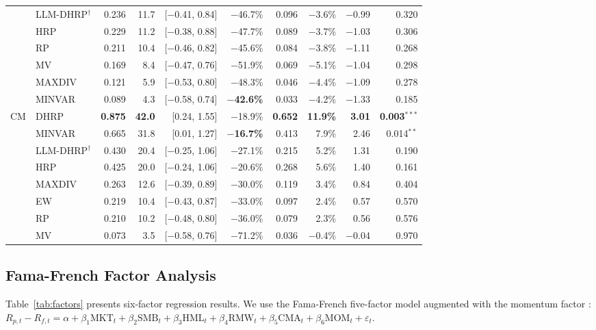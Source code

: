 \begin{table}[t]
{\begin{tabular}{ll rrrrrrrr}
& LLM-DHRP$^{\dagger}$ & 0.236 & 11.7 & [$-$0.41, 0.84] & $-$46.7\% & 0.096 & $-$3.6\% & $-$0.99 & 0.320 \\
& HRP & 0.229 & 11.2 & [$-$0.38, 0.88] & $-$47.7\% & 0.089 & $-$3.7\% & $-$1.03 & 0.306 \\
& RP & 0.211 & 10.4 & [$-$0.46, 0.82] & $-$45.6\% & 0.084 & $-$3.8\% & $-$1.11 & 0.268 \\
& MV & 0.169 & 8.4 & [$-$0.47, 0.76] & $-$51.9\% & 0.069 & $-$5.1\% & $-$1.04 & 0.298 \\
& MAXDIV & 0.121 & 5.9 & [$-$0.53, 0.80] & $-$48.3\% & 0.046 & $-$4.4\% & $-$1.09 & 0.278 \\
& MINVAR & 0.089 & 4.3 & [$-$0.58, 0.74] & \textbf{$-$42.6\%} & 0.033 & $-$4.2\% & $-$1.33 & 0.185 \\
\midrule
\multirow{8}{*}{CM}
& DHRP & \textbf{0.875} & \textbf{42.0} & [0.24, 1.55] & $-$18.9\% & \textbf{0.652} & \textbf{11.9\%} & \textbf{3.01} & \textbf{0.003}$^{***}$ \\
& MINVAR & 0.665 & 31.8 & [0.01, 1.27] & \textbf{$-$16.7\%} & 0.413 & 7.9\% & 2.46 & 0.014$^{**}$ \\
& LLM-DHRP$^{\dagger}$ & 0.430 & 20.4 & [$-$0.25, 1.06] & $-$27.1\% & 0.215 & 5.2\% & 1.31 & 0.190 \\
& HRP & 0.425 & 20.0 & [$-$0.24, 1.06] & $-$20.6\% & 0.268 & 5.6\% & 1.40 & 0.161 \\
& MAXDIV & 0.263 & 12.6 & [$-$0.39, 0.89] & $-$30.0\% & 0.119 & 3.4\% & 0.84 & 0.404 \\
& EW & 0.219 & 10.4 & [$-$0.43, 0.87] & $-$33.0\% & 0.097 & 2.4\% & 0.57 & 0.570 \\
& RP & 0.210 & 10.2 & [$-$0.48, 0.80] & $-$36.0\% & 0.079 & 2.3\% & 0.56 & 0.576 \\
& MV & 0.073 & 3.5 & [$-$0.58, 0.76] & $-$71.2\% & 0.036 & $-$0.4\% & $-$0.04 & 0.970 \\
\bottomrule
\end{tabular}
}
\end{table}

\subsection{Fama-French Factor Analysis}

Table~\ref{tab:factors} presents six-factor regression results. We use the Fama-French five-factor model \citep{FamaFrench2015} augmented with the momentum factor \citep{Carhart1997}: $R_{p,t} - R_{f,t} = \alpha + \beta_1 \text{MKT}_t + \beta_2 \text{SMB}_t + \beta_3 \text{HML}_t + \beta_4 \text{RMW}_t + \beta_5 \text{CMA}_t + \beta_6 \text{MOM}_t + \varepsilon_t$.

